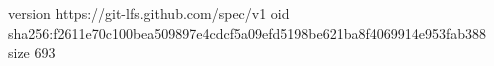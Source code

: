 version https://git-lfs.github.com/spec/v1
oid sha256:f2611e70c100bea509897e4cdcf5a09efd5198be621ba8f4069914e953fab388
size 693
